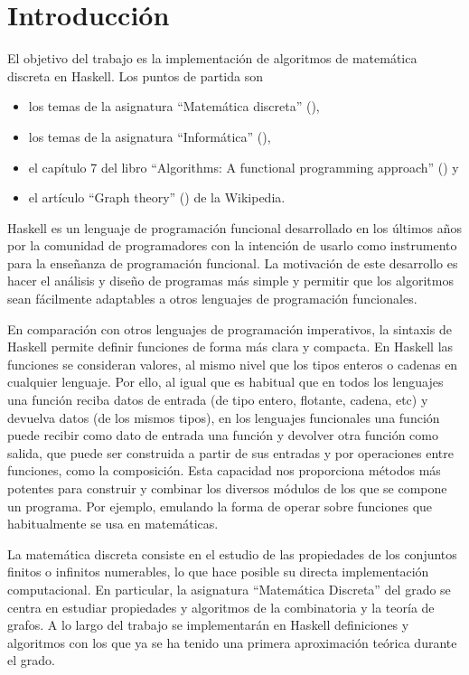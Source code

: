 \chapter*{Introducción}

El objetivo del trabajo es la implementación de algoritmos de matemática
discreta en Haskell. Los puntos de partida son 
\begin{itemize}
  \item los temas de la asignatura ``Matemática discreta'' (\cite{Cardenas-15a}),
  \item los temas de la asignatura ``Informática'' (\cite{Alonso-15a}),
  \item el capítulo 7 del libro ``Algorithms: A functional programming
    approach'' (\cite{Rabhi+Lapalme-99}) y
  \item el artículo ``Graph theory'' (\cite{Wikipedia-grafos}) de la Wikipedia.  
\end{itemize}

Haskell es un lenguaje de programación funcional desarrollado en los últimos
años por la comunidad de programadores con la intención de usarlo como
instrumento para la enseñanza de programación funcional. La motivación de este
desarrollo es hacer el análisis y diseño de programas más simple y permitir que
los algoritmos sean fácilmente adaptables a otros lenguajes de programación 
funcionales.

En comparación con otros lenguajes de programación imperativos, la sintaxis de 
Haskell permite definir funciones de forma más clara y compacta. En Haskell las
funciones se consideran valores, al mismo nivel que los tipos enteros o cadenas
en cualquier lenguaje. Por ello, al igual que es habitual que en todos los 
lenguajes una función reciba datos de entrada (de tipo entero, flotante, cadena,
etc) y devuelva datos (de los mismos tipos), en los lenguajes funcionales una
función puede recibir como dato de entrada una función y devolver otra función
como salida, que puede ser construida a partir de sus entradas y por operaciones
entre funciones, como la composición. Esta capacidad nos proporciona métodos más
potentes para construir y combinar los diversos módulos de los que se compone
un programa. Por ejemplo, emulando la forma de operar sobre funciones que 
habitualmente se usa en matemáticas.

La matemática discreta consiste en el estudio de las propiedades de los 
conjuntos finitos o infinitos numerables, lo que hace posible su directa
implementación computacional. En particular, la asignatura ``Matemática 
Discreta'' del grado se centra en estudiar propiedades y algoritmos de la 
combinatoria y la teoría de grafos. A lo largo del trabajo se implementarán 
en Haskell definiciones y algoritmos con los que ya se ha tenido una primera 
aproximación teórica durante el grado.

